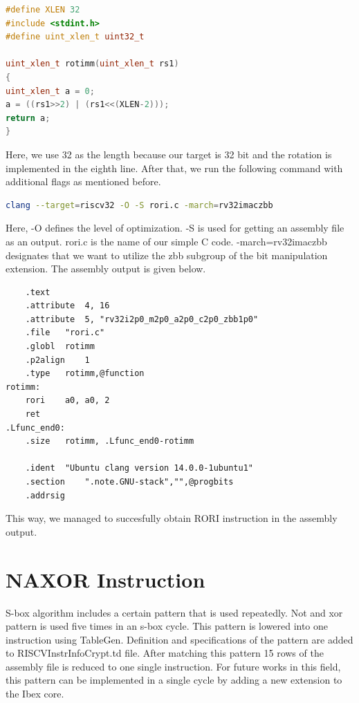 \begin{lstlisting}[language=C++]
#define XLEN 32
#include <stdint.h>
#define uint_xlen_t uint32_t

uint_xlen_t rotimm(uint_xlen_t rs1)
{
uint_xlen_t a = 0;
a = ((rs1>>2) | (rs1<<(XLEN-2)));
return a;
}
\end{lstlisting}

Here, we use 32 as the length because our target is 32 bit and the rotation is implemented in the eighth line. After that, we run the following command with additional flags as mentioned before.

\begin{lstlisting}[language=Bash]
clang --target=riscv32 -O -S rori.c -march=rv32imaczbb
\end{lstlisting}

Here, -O defines the level of optimization. -S is used for getting an assembly file as an output. rori.c is the name of our simple C code. -march=rv32imaczbb designates that we want to utilize the zbb subgroup of the bit manipulation extension. The assembly output is given below.%

\begin{lstlisting}
	.text
	.attribute	4, 16
	.attribute	5, "rv32i2p0_m2p0_a2p0_c2p0_zbb1p0"
	.file	"rori.c"
	.globl	rotimm
	.p2align	1
	.type	rotimm,@function
rotimm:
	rori	a0, a0, 2
	ret
.Lfunc_end0:
	.size	rotimm, .Lfunc_end0-rotimm

	.ident	"Ubuntu clang version 14.0.0-1ubuntu1"
	.section	".note.GNU-stack","",@progbits
	.addrsig
\end{lstlisting}

This way, we managed to succesfully obtain RORI instruction in the assembly output.

\section{NAXOR Instruction}

S-box algorithm includes a certain pattern that is used repeatedly. Not and xor pattern is used five times in an s-box cycle. This pattern is lowered into one instruction using TableGen. Definition and specifications of the pattern are added to RISCVInstrInfoCrypt.td file. After matching this pattern 15 rows of the assembly file is reduced to one single instruction. For future works in this field, this pattern can be implemented in a single cycle by adding a new extension to the Ibex core.  

